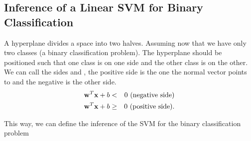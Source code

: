 \documentclass[letterpaper,10pt,english]{jupyterBook}
\begin{document}
\subsection{Inference of a Linear SVM for Binary Classification}
\label{\detokenize{classification_svms:inference-of-a-linear-svm-for-binary-classification}}
\sphinxAtStartPar
A hyperplane divides a space into two halves. Assuming now that we have only two classes (a binary classification problem). The hyperplane should be positioned such that one class is on one side and the other class is on the other. We can call the sides  and , the positive side is the one the normal vector points to and the negative is the other side.
\label{equation:classification_svms:bf4d2efe-8b5a-487c-a31b-36c138e44499}\begin{eqnarray}
{\bf w}^{T} {\bf x} + b &<& 0\,\, \mbox{(negative side)} \nonumber \\
{\bf w}^{T} {\bf x} + b &\geq& 0\,\, \mbox{(positive side)}. \nonumber
\end{eqnarray}\begin{center}\end{center}
\sphinxAtStartPar
This way, we can define the inference of the SVM for the binary classification problem
\label{classification_svms:definition-1}
\end{document}
